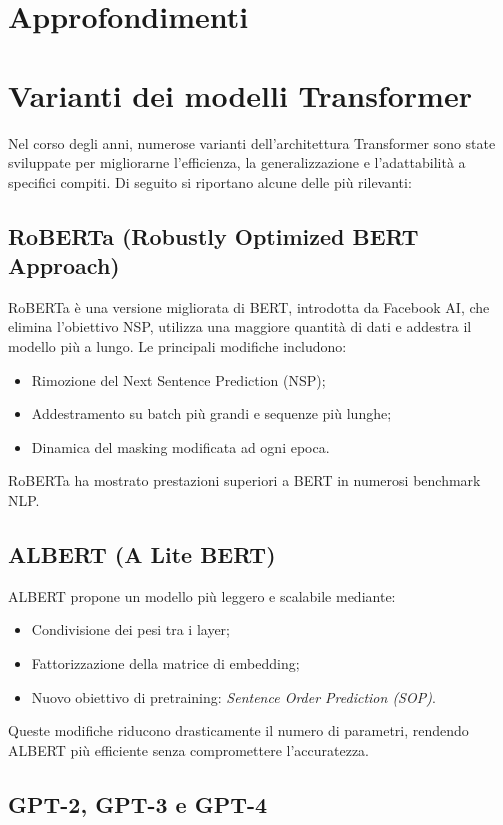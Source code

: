 \section*{Approfondimenti}
\section{Varianti dei modelli Transformer}

Nel corso degli anni, numerose varianti dell’architettura Transformer sono state sviluppate per migliorarne l’efficienza, la generalizzazione e l’adattabilità a specifici compiti. Di seguito si riportano alcune delle più rilevanti:

\subsection{RoBERTa (Robustly Optimized BERT Approach)}

RoBERTa è una versione migliorata di BERT, introdotta da Facebook AI, che elimina l’obiettivo NSP, utilizza una maggiore quantità di dati e addestra il modello più a lungo. Le principali modifiche includono:
\begin{itemize}
    \item Rimozione del Next Sentence Prediction (NSP);
    \item Addestramento su batch più grandi e sequenze più lunghe;
    \item Dinamica del masking modificata ad ogni epoca.
\end{itemize}
RoBERTa ha mostrato prestazioni superiori a BERT in numerosi benchmark NLP.

\subsection{ALBERT (A Lite BERT)}

ALBERT propone un modello più leggero e scalabile mediante:
\begin{itemize}
    \item Condivisione dei pesi tra i layer;
    \item Fattorizzazione della matrice di embedding;
    \item Nuovo obiettivo di pretraining: \textit{Sentence Order Prediction (SOP)}.
\end{itemize}
Queste modifiche riducono drasticamente il numero di parametri, rendendo ALBERT più efficiente senza compromettere l’accuratezza.

\subsection{GPT-2, GPT-3 e GPT-4}

